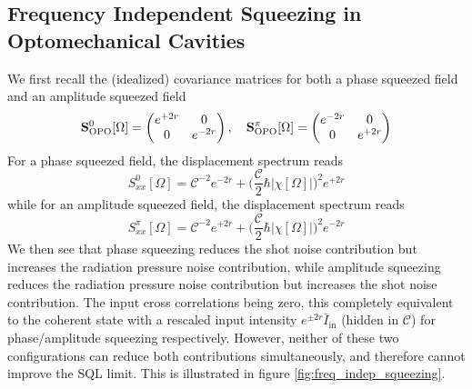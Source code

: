 \subsection{Frequency Independent Squeezing in Optomechanical Cavities}
We first recall the (idealized) covariance matrices for both a phase squeezed field and an amplitude squeezed field 
\begin{equation*}
  \mathbf{S}^{0}_{\rm OPO}[\Omega] = 
  \begin{pmatrix}
    e^{+2r} & 0\\
    0 & e^{-2r}
  \end{pmatrix}, \quad
  \mathbf{S}^{\pi}_{\rm OPO}[\Omega] = 
  \begin{pmatrix}
    e^{-2r} & 0\\
    0 & e^{+2r}
  \end{pmatrix}
\end{equation*}
For a phase squeezed field, the displacement spectrum reads
\begin{equation}
  S_{xx}^{0}[\Omega] =   \mathcal{C}^{-2}  e^{-2r} + \bigg(\dfrac{\mathcal{C} }{2} \hbar |\chi[\Omega]| \bigg)^2 e^{+2r}
\end{equation}
while for an amplitude squeezed field, the displacement spectrum reads
\begin{equation}
  S_{xx}^{\pi}[\Omega] =  \mathcal{C}^{-2}  e^{+2r} + \bigg(\dfrac{\mathcal{C} }{2} \hbar |\chi[\Omega]| \bigg)^2 e^{-2r}
\end{equation}
We then see that phase squeezing reduces the shot noise contribution but increases the radiation pressure noise contribution, while amplitude squeezing reduces the radiation pressure noise contribution but increases the shot noise contribution. The input cross correlations being zero, this completely equivalent to the coherent state with a rescaled input intensity $e^{\pm 2r} \bar{I}_\mathrm{in} $ (hidden in $\mathcal{C}$) for phase/amplitude squeezing respectively.
However, neither of these two configurations can reduce both contributions simultaneously, and therefore cannot improve the SQL limit. This is illustrated in figure \ref{fig:freq_indep_squeezing}. 

